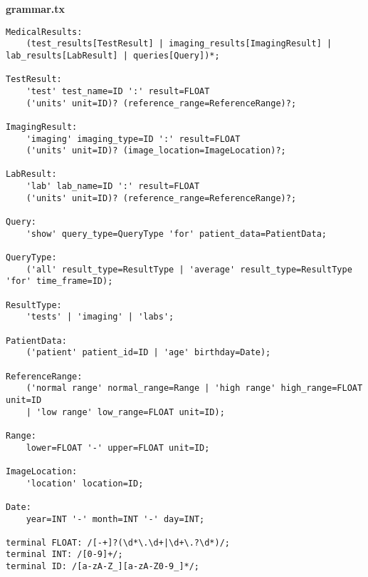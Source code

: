 \textbf{grammar.tx}
\begin{lstlisting}
MedicalResults:
    (test_results[TestResult] | imaging_results[ImagingResult] | lab_results[LabResult] | queries[Query])*;

TestResult:
    'test' test_name=ID ':' result=FLOAT 
    ('units' unit=ID)? (reference_range=ReferenceRange)?;

ImagingResult:
    'imaging' imaging_type=ID ':' result=FLOAT 
    ('units' unit=ID)? (image_location=ImageLocation)?;

LabResult:
    'lab' lab_name=ID ':' result=FLOAT 
    ('units' unit=ID)? (reference_range=ReferenceRange)?;

Query:
    'show' query_type=QueryType 'for' patient_data=PatientData;

QueryType:
    ('all' result_type=ResultType | 'average' result_type=ResultType 'for' time_frame=ID);

ResultType:
    'tests' | 'imaging' | 'labs';

PatientData:
    ('patient' patient_id=ID | 'age' birthday=Date);

ReferenceRange:
    ('normal range' normal_range=Range | 'high range' high_range=FLOAT unit=ID 
    | 'low range' low_range=FLOAT unit=ID);

Range:
    lower=FLOAT '-' upper=FLOAT unit=ID;

ImageLocation:
    'location' location=ID;

Date:
    year=INT '-' month=INT '-' day=INT;

terminal FLOAT: /[-+]?(\d*\.\d+|\d+\.?\d*)/;
terminal INT: /[0-9]+/;
terminal ID: /[a-zA-Z_][a-zA-Z0-9_]*/;
\end{lstlisting}

